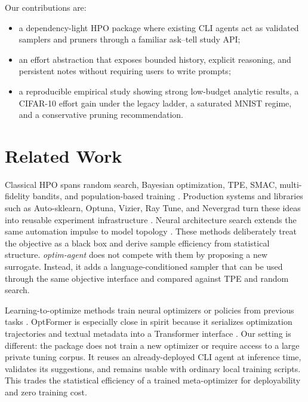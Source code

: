 \documentclass[letterpaper]{article}
\begin{document}
Our contributions are:
\begin{itemize}
\item a dependency-light HPO package where existing CLI agents act as validated
samplers and pruners through a familiar ask--tell study API;
\item an effort abstraction that exposes bounded history, explicit reasoning,
and persistent notes without requiring users to write prompts;
\item a reproducible empirical study showing strong low-budget analytic results,
a CIFAR-10 effort gain under the legacy ladder, a saturated MNIST regime, and a
conservative pruning recommendation.
\end{itemize}

\section{Related Work}

Classical HPO spans random search, Bayesian optimization, TPE, SMAC,
multi-fidelity bandits, and population-based training
\cite{bergstra2012random,jones1998efficient,bergstra2011algorithms,hutter2011smb,li2017hyperband,li2020asha,jaderberg2017pbt}.
Production systems and libraries such as Auto-sklearn, Optuna, Vizier, Ray Tune,
and Nevergrad turn these ideas into reusable experiment infrastructure
\cite{feurer2015autosklearn,akiba2019optuna,golovin2017google,liaw2018tune,rapin2018nevergrad,hutter2019automl}.
Neural architecture search extends the same automation impulse to model topology
\cite{zoph2017nas,elsken2019nas,liu2019darts}. These methods deliberately treat
the objective as a black box and derive sample efficiency from statistical
structure. \emph{optim-agent} does not compete with them by proposing a new
surrogate. Instead, it adds a language-conditioned sampler that can be used
through the same objective interface and compared against TPE and random search.

Learning-to-optimize methods train neural optimizers or policies from previous
tasks \cite{chen2018neuraloptimizer,chen2022optformer}. OptFormer is especially
close in spirit because it serializes optimization trajectories and textual
metadata into a Transformer interface \cite{chen2022optformer}. Our setting is
different: the package does not train a new optimizer or require access to a
large private tuning corpus. It reuses an already-deployed CLI agent at inference
time, validates its suggestions, and remains usable with ordinary local
training scripts. This trades the statistical efficiency of a trained
meta-optimizer for deployability and zero training cost.
\end{document}
